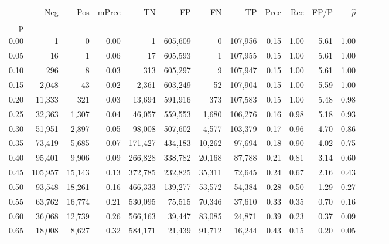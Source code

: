 \begin{tabular}{rrrrrrrrrrrrrrr}
\toprule
{} &      Neg &     Pos & mPrec &       TN &       FP &       FN &       TP &  Prec &   Rec &  FP/P & $\hat{p}$ \\
p    &          &         &       &          &          &          &          &       &       &       &           \\
\midrule
0.00 &        1 &       0 &  0.00 &        1 &  605,609 &        0 &  107,956 &  0.15 &  1.00 &  5.61 &      1.00 \\
0.05 &       16 &       1 &  0.06 &       17 &  605,593 &        1 &  107,955 &  0.15 &  1.00 &  5.61 &      1.00 \\
0.10 &      296 &       8 &  0.03 &      313 &  605,297 &        9 &  107,947 &  0.15 &  1.00 &  5.61 &      1.00 \\
0.15 &    2,048 &      43 &  0.02 &    2,361 &  603,249 &       52 &  107,904 &  0.15 &  1.00 &  5.59 &      1.00 \\
0.20 &   11,333 &     321 &  0.03 &   13,694 &  591,916 &      373 &  107,583 &  0.15 &  1.00 &  5.48 &      0.98 \\
0.25 &   32,363 &   1,307 &  0.04 &   46,057 &  559,553 &    1,680 &  106,276 &  0.16 &  0.98 &  5.18 &      0.93 \\
0.30 &   51,951 &   2,897 &  0.05 &   98,008 &  507,602 &    4,577 &  103,379 &  0.17 &  0.96 &  4.70 &      0.86 \\
0.35 &   73,419 &   5,685 &  0.07 &  171,427 &  434,183 &   10,262 &   97,694 &  0.18 &  0.90 &  4.02 &      0.75 \\
0.40 &   95,401 &   9,906 &  0.09 &  266,828 &  338,782 &   20,168 &   87,788 &  0.21 &  0.81 &  3.14 &      0.60 \\
0.45 &  105,957 &  15,143 &  0.13 &  372,785 &  232,825 &   35,311 &   72,645 &  0.24 &  0.67 &  2.16 &      0.43 \\
0.50 &   93,548 &  18,261 &  0.16 &  466,333 &  139,277 &   53,572 &   54,384 &  0.28 &  0.50 &  1.29 &      0.27 \\
0.55 &   63,762 &  16,774 &  0.21 &  530,095 &   75,515 &   70,346 &   37,610 &  0.33 &  0.35 &  0.70 &      0.16 \\
0.60 &   36,068 &  12,739 &  0.26 &  566,163 &   39,447 &   83,085 &   24,871 &  0.39 &  0.23 &  0.37 &      0.09 \\
0.65 &   18,008 &   8,627 &  0.32 &  584,171 &   21,439 &   91,712 &   16,244 &  0.43 &  0.15 &  0.20 &      0.05 \\

\end{tabular}
